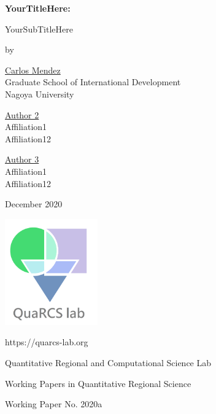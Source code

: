 \documentclass[12pt,twoside]{article}
\begin{document}

\begin{titlepage}
\begin{center}
\vspace{7cm}

\begin{spacing}{1.1}

\huge
\textbf{
\textcolor{ChadBlue}{
YourTitleHere: 
}
}

\vspace{0.3cm}

\Large
\textcolor{ChadBlue}{
YourSubTitleHere
}
\end{spacing}


\vspace{0.3cm}
\large
by
\vspace{0.3cm}

\href{https://carlos-mendez.rbind.io}{Carlos Mendez}\\
Graduate School of International Development\\
Nagoya University

\href{https://carlos-mendez.rbind.io}{Author 2}\\
Affiliation1 \\
Affiliation12

\href{https://carlos-mendez.rbind.io}{Author 3}\\
Affiliation1 \\
Affiliation12

\vspace{2cm}
\normalsize
December 2020

\includegraphics[width=0.3\textwidth]{logo.png}

https://quarcs-lab.org

Quantitative Regional and Computational Science Lab

Working Papers in Quantitative Regional Science

Working Paper No. 2020a



\end{center}



\end{titlepage}
\end{document}
